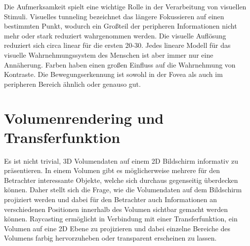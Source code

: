 Die Aufmerksamkeit spielt eine wichtige Rolle in der Verarbeitung von visuellen Stimuli. %
Visuelles tunneling bezeichnet das längere Fokussieren auf einen bestimmten Punkt, wodurch ein Großteil der peripheren Informationen nicht mehr oder stark reduziert wahrgenommen werden.
Die visuelle Auflösung reduziert sich circa linear für die ersten 20-30\textdegree{}.
Jedes lineare Modell für das visuelle Wahrnehmungssystem des Menschen ist aber immer nur eine Annäherung.
Farben haben einen großen Einfluss auf die Wahrnehmung von Kontraste.
Die Bewegungserkennung ist sowohl in der Fovea als auch im peripheren Bereich ähnlich oder genauso gut.

\section{Volumenrendering und Transferfunktion}\label{sec::voltff}
Es ist nicht trivial, 3D Volumendaten auf einem 2D Bildschirm informativ zu präsentieren.
In einem Volumen gibt es möglicherweise mehrere für den Betrachter interessante Objekte, welche sich durchaus gegenseitig überdecken können.
Daher stellt sich die Frage, wie die Volumendaten auf dem Bildschirm projiziert werden und dabei für den Betrachter auch Informationen an verschiedenen Positionen innerhalb des Volumen sichtbar gemacht werden können.
Raycasting ermöglicht in Verbindung mit einer Transferfunktion, ein Volumen auf eine 2D Ebene zu projizieren und dabei einzelne Bereiche des Volumens farbig hervorzuheben oder transparent erscheinen zu lassen.

